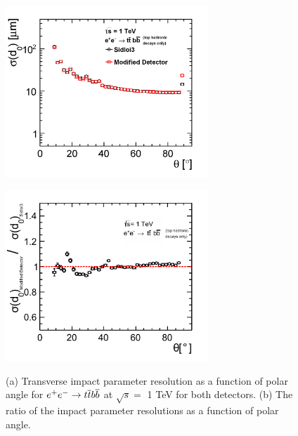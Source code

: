 \begin{figure}[h!]
\begin{minipage}{3.0in}
\centering
\includegraphics[width=3.0in]{ttbb6qallD0ResolutionTheta_sidloi3_det_vtxbar_3doublet.png}
\label{fig:ttbbd0restwodetectors}
\end{minipage}
\begin{minipage}{3.0in}
\centering
\includegraphics[width=3.0in]{ttbb6qallD0ResolutionThetaRatio2.pdf}
\label{fig:ttbbd0resratio}
\end{minipage}
\caption{(a) Transverse impact parameter resolution as a function of polar angle for
$\ee \rightarrow \ttbar \bbbar $  at $\sqrt{s} = $ 1 TeV for both detectors.
(b) The ratio of the impact parameter resolutions as a function of polar angle.}
\label{fig:ttbbd0res}
\end{figure}
